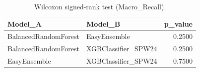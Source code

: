 \begin{table}[t]
\centering
\begin{tabular}{llr}
\toprule
Model_A & Model_B & p_value \\
\midrule
BalancedRandomForest & EasyEnsemble & 0.2500 \\
BalancedRandomForest & XGBClassifier_SPW24 & 0.2500 \\
EasyEnsemble & XGBClassifier_SPW24 & 0.7500 \\
\bottomrule
\end{tabular}
\caption{Wilcoxon signed-rank test (Macro_Recall).}
\label{tab:wilcoxon_Macro_Recall}
\end{table}